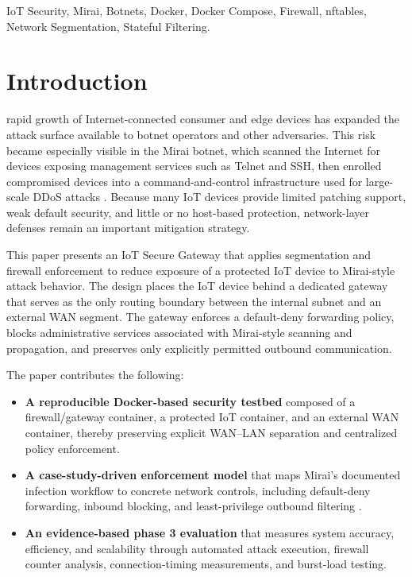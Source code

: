 \documentclass[journal]{IEEEtran}
\begin{document}
\begin{IEEEkeywords}
IoT Security, Mirai, Botnets, Docker, Docker Compose, Firewall, nftables, Network Segmentation, Stateful Filtering.
\end{IEEEkeywords}

\section{Introduction}
 rapid growth of Internet-connected consumer and edge devices has expanded the attack surface available to botnet operators and other adversaries. This risk became especially visible in the Mirai botnet, which scanned the Internet for devices exposing management services such as Telnet and SSH, then enrolled compromised devices into a command-and-control infrastructure used for large-scale DDoS attacks \cite{mirai_usenix}. Because many IoT devices provide limited patching support, weak default security, and little or no host-based protection, network-layer defenses remain an important mitigation strategy.

This paper presents an IoT Secure Gateway that applies segmentation and firewall enforcement to reduce exposure of a protected IoT device to Mirai-style attack behavior. The design places the IoT device behind a dedicated gateway that serves as the only routing boundary between the internal subnet and an external WAN segment. The gateway enforces a default-deny forwarding policy, blocks administrative services associated with Mirai-style scanning and propagation, and preserves only explicitly permitted outbound communication.

The paper contributes the following:
\begin{itemize}
\item \textbf{A reproducible Docker-based security testbed} composed of a firewall/gateway container, a protected IoT container, and an external WAN container, thereby preserving explicit WAN--LAN separation and centralized policy enforcement.
\item \textbf{A case-study-driven enforcement model} that maps Mirai's documented infection workflow to concrete network controls, including default-deny forwarding, inbound blocking, and least-privilege outbound filtering \cite{mirai_usenix}.
\item \textbf{An evidence-based phase 3 evaluation} that measures system accuracy, efficiency, and scalability through automated attack execution, firewall counter analysis, connection-timing measurements, and burst-load testing.
\end{itemize}
\end{document}
